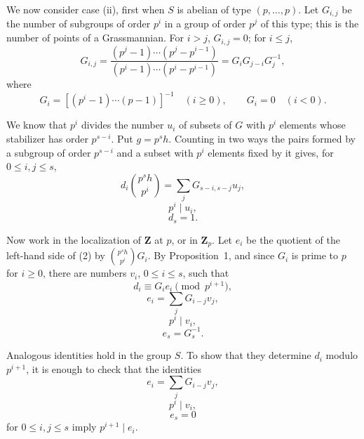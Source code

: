 \documentclass[12pt]{amsart}
\theoremstyle{plain}
\begin{document}
We now consider case (ii), first when $S$ is abelian of type $(p,\ldots,p)$. Let $G_{i,j}$ be the number of subgroups of order $p^i$ in a group of order $p^j$ of this type; this is the number of points of a Grassmannian. For $i>j$, $G_{i,j}=0$; for $i\leq j$,
\[
G_{i,j}=\frac{(p^j-1)\cdots(p^j-p^{i-1})}{(p^i-1)\cdots(p^i-p^{i-1})}=G_iG_{j-i}G_j^{-1},
\]
where
\[
G_i=[(p^i-1)\cdots(p-1)]^{-1}\quad (i\geq 0),\qquad G_i=0\quad (i<0).
\]

We know that $p^i$ divides the number $u_i$ of subsets of $G$ with $p^i$ elements whose stabilizer has order $p^{s-i}$. Put $g=p^s h$. Counting in two ways the pairs formed by a subgroup of order $p^{s-i}$ and a subset with $p^i$ elements fixed by it gives, for $0\leq i,j\leq s$,
\begin{equation}
d_i\binom{p^s h}{p^i}=\sum_j G_{s-i,s-j}u_j,
\end{equation}
\begin{equation}
p^i\mid u_i,
\end{equation}
\begin{equation}
d_s=1.
\end{equation}

Now work in the localization of $\mathbf Z$ at $p$, or in $\mathbf Z_p$. Let $e_i$ be the quotient of the left-hand side of (2) by $\binom{p^s h}{p^i}G_i$. By Proposition~1, and since $G_i$ is prime to $p$ for $i\geq 0$, there are numbers $v_i$, $0\leq i\leq s$, such that
\begin{equation}
d_i\equiv G_i e_i\pmod {p^{i+1}},
\end{equation}
\begin{equation}
e_i=\sum_j G_{i-j}v_j,
\tag{$2'$}
\end{equation}
\begin{equation}
p^i\mid v_i,
\end{equation}
\begin{equation}
e_s=G_s^{-1}.
\end{equation}

Analogous identities hold in the group $S$. To show that they determine $d_i$ modulo $p^{i+1}$, it is enough to check that the identities
\begin{equation}
e_i=\sum_j G_{i-j}v_j,
\end{equation}
\begin{equation}
p^i\mid v_i,
\end{equation}
\begin{equation}
e_s=0
\end{equation}
for $0\leq i,j\leq s$ imply $p^{i+1}\mid e_i$.
\end{document}

